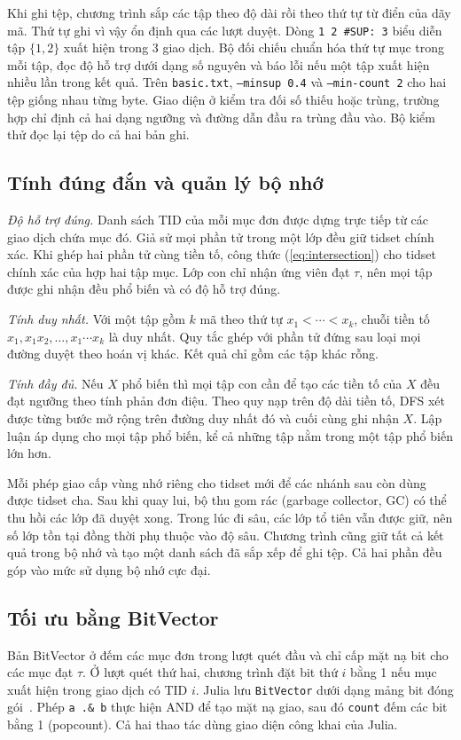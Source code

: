 Khi ghi tệp, chương trình sắp các tập theo độ dài rồi theo thứ tự từ điển
của dãy mã. Thứ tự ghi vì vậy ổn định qua các lượt duyệt. Dòng
\texttt{1 2 \#SUP: 3} biểu diễn tập $\{1,2\}$ xuất hiện trong 3 giao dịch.
Bộ đối chiếu chuẩn hóa thứ tự mục trong mỗi tập, đọc độ hỗ trợ dưới dạng
số nguyên và báo lỗi nếu một tập xuất hiện nhiều lần trong kết quả.
Trên \texttt{basic.txt}, \texttt{--minsup 0.4} và \texttt{--min-count 2}
cho hai tệp giống nhau từng byte. Giao diện ở  kiểm
tra đối số thiếu hoặc trùng, trường hợp chỉ định cả hai dạng ngưỡng và
đường dẫn đầu ra trùng đầu vào. Bộ kiểm thử đọc lại tệp do cả hai bản ghi.

\subsection{Tính đúng đắn và quản lý bộ nhớ}
\textit{Độ hỗ trợ đúng.} Danh sách TID của mỗi mục đơn được dựng trực
tiếp từ các giao dịch chứa mục đó. Giả sử mọi phần tử trong một lớp
đều giữ tidset chính xác. Khi ghép hai phần tử cùng tiền tố, công thức
(\ref{eq:intersection}) cho tidset chính xác của hợp hai tập mục. Lớp
con chỉ nhận ứng viên đạt $\tau$, nên mọi tập được ghi nhận đều phổ biến
và có độ hỗ trợ đúng.

\textit{Tính duy nhất.} Với một tập gồm $k$ mã theo thứ tự
$x_1<\cdots<x_k$, chuỗi tiền tố $x_1,x_1x_2,\ldots,x_1\cdots x_k$ là
duy nhất. Quy tắc ghép với phần tử đứng sau loại mọi đường duyệt theo
hoán vị khác. Kết quả chỉ gồm các tập khác rỗng.

\textit{Tính đầy đủ.} Nếu $X$ phổ biến thì mọi tập con cần để tạo các
tiền tố của $X$ đều đạt ngưỡng theo tính phản đơn điệu. Theo quy nạp trên
độ dài tiền tố, DFS xét được từng bước mở rộng trên đường duy nhất đó và
cuối cùng ghi nhận $X$. Lập luận áp dụng cho mọi tập phổ biến, kể cả
những tập nằm trong một tập phổ biến lớn hơn.

Mỗi phép giao cấp vùng nhớ riêng cho tidset mới để các nhánh sau còn
dùng được tidset cha. Sau khi quay lui, bộ thu gom rác (garbage collector,
GC) có thể thu hồi các lớp đã duyệt xong. Trong lúc đi sâu, các lớp tổ
tiên vẫn được giữ, nên số lớp tồn tại đồng thời phụ thuộc vào độ sâu.
Chương trình cũng giữ tất cả kết quả trong bộ nhớ và tạo một danh sách
đã sắp xếp để ghi tệp. Cả hai phần đều góp vào mức sử dụng bộ nhớ cực đại.

\subsection{Tối ưu bằng BitVector}
Bản BitVector ở  đếm các mục đơn trong
lượt quét đầu và chỉ cấp mặt nạ bit cho các mục đạt $\tau$. Ở lượt quét
thứ hai, chương trình đặt bit thứ $i$ bằng 1 nếu mục xuất hiện trong
giao dịch có TID $i$. Julia lưu \texttt{BitVector} dưới dạng mảng bit
đóng gói~\cite{juliaarrays}. Phép \texttt{a .\& b} thực hiện AND để
tạo mặt nạ giao, sau đó \texttt{count} đếm các bit bằng 1
(popcount). Cả hai thao tác dùng giao diện công khai của Julia.

